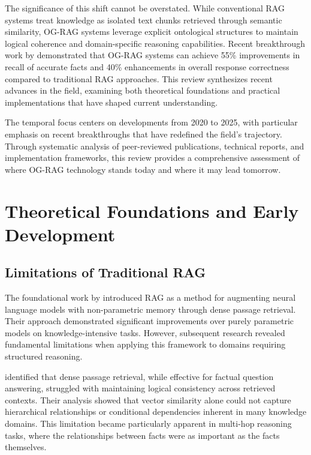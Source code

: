 \documentclass[12pt]{report}
\begin{document}
The significance of this shift cannot be overstated. While conventional RAG systems treat knowledge as isolated text chunks retrieved through semantic similarity, OG-RAG systems leverage explicit ontological structures to maintain logical coherence and domain-specific reasoning capabilities. Recent breakthrough work by \citet{sharmaOGRAGOntologyGroundedRetrievalAugmented2024} demonstrated that OG-RAG systems can achieve 55\% improvements in recall of accurate facts and 40\% enhancements in overall response correctness compared to traditional RAG approaches. This review synthesizes recent advances in the field, examining both theoretical foundations and practical implementations that have shaped current understanding.

The temporal focus centers on developments from 2020 to 2025, with particular emphasis on recent breakthroughs that have redefined the field's trajectory. Through systematic analysis of peer-reviewed publications, technical reports, and implementation frameworks, this review provides a comprehensive assessment of where OG-RAG technology stands today and where it may lead tomorrow.

\section{Theoretical Foundations and Early Development}

\subsection{Limitations of Traditional RAG}

The foundational work by \citet{lewis2020retrieval} introduced RAG as a method for augmenting neural language models with non-parametric memory through dense passage retrieval. Their approach demonstrated significant improvements over purely parametric models on knowledge-intensive tasks. However, subsequent research revealed fundamental limitations when applying this framework to domains requiring structured reasoning.

\citet{karpukhin2020dense} identified that dense passage retrieval, while effective for factual question answering, struggled with maintaining logical consistency across retrieved contexts. Their analysis showed that vector similarity alone could not capture hierarchical relationships or conditional dependencies inherent in many knowledge domains. This limitation became particularly apparent in multi-hop reasoning tasks, where the relationships between facts were as important as the facts themselves.
\end{document}
